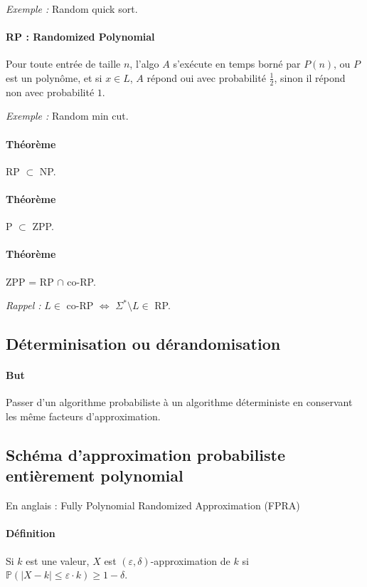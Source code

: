 \documentclass[french]{article}
\begin{document}
\emph{Exemple :} Random quick sort. 

\paragraph{RP : Randomized Polynomial} Pour toute entrée de taille $n$, l’algo $A$ s’exécute en temps borné par $P(n)$, ou $P$ est un polynôme, et si $x \in L$, $A$ répond \og oui \fg{} avec probabilité $\frac{1}{2}$, sinon il répond non avec probabilité $1$.

\emph{Exemple :} Random min cut. 

\paragraph{Théorème} RP $\subset$ NP.
\paragraph{Théorème} P $\subset$ ZPP.
\paragraph{Théorème} ZPP = RP $\cap$ co-RP.

\emph{Rappel :} $L \in $ co-RP $ \Longleftrightarrow $ $\Sigma^* \setminus L \in $ RP.

\subsection{Déterminisation ou dérandomisation}

\paragraph{But} Passer d’un algorithme probabiliste à un algorithme déterministe en conservant les même facteurs d’approximation.

\subsection{Schéma d’approximation probabiliste entièrement polynomial}

En anglais : Fully Polynomial Randomized Approximation (FPRA)

\paragraph{Définition} Si $k$ est une valeur, $X$ est $(\varepsilon, \delta)$-approximation de $k$ si $\mathbb{P}(\left| X - k \right| \leq \varepsilon \cdot k) \geq 1 - \delta$.
\end{document}
